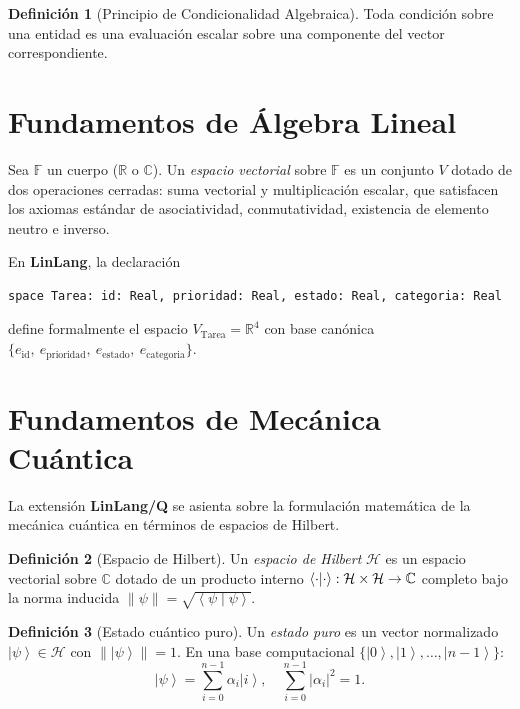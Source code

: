 \documentclass[12pt, a4paper, openany]{report}
\theoremstyle{definition}
\newtheorem{definition}{Definición}[chapter]
\newcommand{\linlang}{\textbf{LinLang}}
\newcommand{\linlangQ}{\textbf{LinLang/Q}}
\newcommand{\Hilbert}{\mathcal{H}}
\newcommand{\ket}[1]{\left|#1\right\rangle}
\newcommand{\braketnotation}[2]{\left\langle#1\middle|#2\right\rangle}
\begin{document}
\begin{definition}[Principio de Condicionalidad Algebraica]
Toda condición sobre una entidad es una evaluación escalar sobre una componente del vector correspondiente.
\end{definition}

\section{Fundamentos de Álgebra Lineal}

Sea $\mathbb{F}$ un cuerpo ($\mathbb{R}$ o $\mathbb{C}$). Un \emph{espacio vectorial} sobre $\mathbb{F}$ es un conjunto $V$ dotado de dos operaciones cerradas: suma vectorial y multiplicación escalar, que satisfacen los axiomas estándar de asociatividad, conmutatividad, existencia de elemento neutro e inverso.

En \linlang{}, la declaración

\begin{lstlisting}
space Tarea: id: Real, prioridad: Real, estado: Real, categoria: Real
\end{lstlisting}

define formalmente el espacio $V_{\text{Tarea}} = \mathbb{R}^4$ con base canónica $\{e_{\text{id}},\ e_{\text{prioridad}},\ e_{\text{estado}},\ e_{\text{categoria}}\}$.

\section{Fundamentos de Mecánica Cuántica}

La extensión \linlangQ{} se asienta sobre la formulación matemática de la mecánica cuántica en términos de espacios de Hilbert.

\begin{definition}[Espacio de Hilbert]
Un \emph{espacio de Hilbert} $\Hilbert$ es un espacio vectorial sobre $\mathbb{C}$ dotado de un producto interno $\braket{\cdot|\cdot}: \Hilbert \times \Hilbert \to \mathbb{C}$ completo bajo la norma inducida $\|\psi\| = \sqrt{\braketnotation{\psi}{\psi}}$.
\end{definition}

\begin{definition}[Estado cuántico puro]
Un \emph{estado puro} es un vector normalizado $\ket{\psi} \in \Hilbert$ con $\|\ket{\psi}\| = 1$. En una base computacional $\{\ket{0}, \ket{1}, \ldots, \ket{n-1}\}$:
\[
  \ket{\psi} = \sum_{i=0}^{n-1} \alpha_i \ket{i},\quad \sum_{i=0}^{n-1} |\alpha_i|^2 = 1.
\]
\end{definition}
\end{document}
